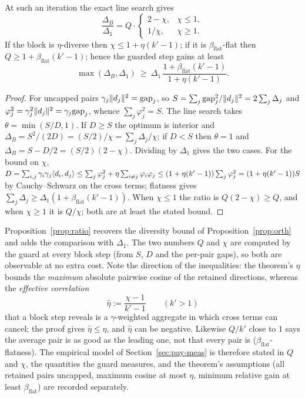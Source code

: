 \begin{proposition}\label{prop:ratio}
At such an iteration the exact line search gives
\[
\frac{\Delta_B}{\Delta_1}=Q\cdot\begin{cases}2-\chi,&\chi\le1,\\
1/\chi,&\chi\ge1.\end{cases}
\]
If the block is $\eta$-diverse then $\chi\le1+\eta(k'-1)$; if it is
$\beta_{\mathrm{flat}}$-flat then $Q\ge1+\beta_{\mathrm{flat}}(k'-1)$; hence the guarded step gains at
least
\[
\max(\Delta_B,\Delta_1)\ \ge\ \Delta_1\,\frac{1+\beta_{\mathrm{flat}}(k'-1)}{1+\eta(k'-1)} .
\]
\end{proposition}
\begin{proof}
For uncapped pairs $\gamma_j\lVert d_j \rVert^2=\mathrm{gap}_j$, so
$S=\sum_j\mathrm{gap}_j^2/\lVert d_j \rVert^2=2\sum_j\Delta_j$ and
$\varphi_j^2=\gamma_j^2\lVert d_j \rVert^2=\gamma_j\mathrm{gap}_j$, whence
$\sum_j\varphi_j^2=S$. The line search takes $\theta=\min(S/D,1)$. If $D\ge S$
the optimum is interior and $\Delta_B=S^2/(2D)=(S/2)/\chi=\sum_j\Delta_j/\chi$;
if $D<S$ then $\theta=1$ and $\Delta_B=S-D/2=(S/2)(2-\chi)$. Dividing
by $\Delta_1$ gives the two cases. For the bound on $\chi$,
$D=\sum_{i,j}\gamma_i\gamma_j\langle d_i, d_j \rangle\le\sum_j\varphi_j^2+\eta\sum_{i\ne j}\varphi_i\varphi_j
\le(1+\eta(k'-1))\sum_j\varphi_j^2=(1+\eta(k'-1))S$ by Cauchy--Schwarz on the
cross terms; flatness gives $\sum_j\Delta_j\ge\Delta_1(1+\beta_{\mathrm{flat}}(k'-1))$.
When $\chi\le1$ the ratio is $Q(2-\chi)\ge Q$, and when $\chi\ge1$
it is $Q/\chi$; both are at least the stated bound.
\end{proof}
Proposition~\ref{prop:ratio} recovers the diversity bound of Proposition~\ref{prop:orth} and adds the comparison with $\Delta_1$. The two
numbers $Q$ and $\chi$ are computed by the guard at every block step
(from $S$, $D$ and the per-pair gaps), so both are observable at no
extra cost. Note the direction of the inequalities: the theorem's $\eta$
bounds the \emph{maximum} absolute pairwise cosine of the retained
directions, whereas the \emph{effective correlation}
\[
\hat\eta:=\frac{\chi-1}{k'-1}\qquad(k'>1)
\]
that a block step reveals is a $\gamma$-weighted aggregate in which
cross terms can cancel; the proof gives $\hat\eta\le\eta$, and $\hat\eta$
can be negative. Likewise $Q/k'$ close to $1$ says the average pair is
as good as the leading one, not that every pair is ($\beta_{\mathrm{flat}}$-flatness).
The empirical model of Section~\ref{sec:pay-meas} is therefore stated in
$Q$ and $\chi$, the quantities the guard measures, and the theorem's
assumptions (all retained pairs uncapped, maximum cosine at most $\eta$,
minimum relative gain at least $\beta_{\mathrm{flat}}$) are recorded separately.

